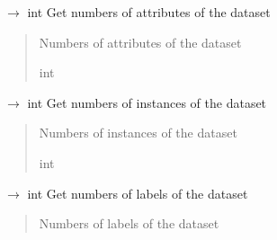 \documentclass[letterpaper,10pt,english]{sphinxmanual}
\begin{document}
\begin{fulllineitems}
\begin{fulllineitems}
\label{\detokenize{data/_autosummary/miml.data.miml_dataset.MIMLDataset:miml.data.miml_dataset.MIMLDataset.get_number_features}}
\pysigstartsignatures
\pysiglinewithargsret
{}
{}
{{ $\rightarrow$ int}}
\pysigstopsignatures
\sphinxAtStartPar
Get numbers of attributes of the dataset
\begin{quote}\begin{description}
\sphinxAtStartPar
{} \textendash{} Numbers of attributes of the dataset

\sphinxAtStartPar
int

\end{description}\end{quote}

\end{fulllineitems}


\begin{fulllineitems}
\label{\detokenize{data/_autosummary/miml.data.miml_dataset.MIMLDataset:miml.data.miml_dataset.MIMLDataset.get_number_instances}}
\pysigstartsignatures
\pysiglinewithargsret
{}
{}
{{ $\rightarrow$ int}}
\pysigstopsignatures
\sphinxAtStartPar
Get numbers of instances of the dataset
\begin{quote}\begin{description}
\sphinxAtStartPar
{} \textendash{} Numbers of instances of the dataset

\sphinxAtStartPar
int

\end{description}\end{quote}

\end{fulllineitems}


\begin{fulllineitems}
\label{\detokenize{data/_autosummary/miml.data.miml_dataset.MIMLDataset:miml.data.miml_dataset.MIMLDataset.get_number_labels}}
\pysigstartsignatures
\pysiglinewithargsret
{}
{}
{{ $\rightarrow$ int}}
\pysigstopsignatures
\sphinxAtStartPar
Get numbers of labels of the dataset
\begin{quote}\begin{description}
\sphinxAtStartPar
{} \textendash{} Numbers of labels of the dataset


\end{description}
\end{quote}
\end{fulllineitems}
\end{fulllineitems}
\end{document}
